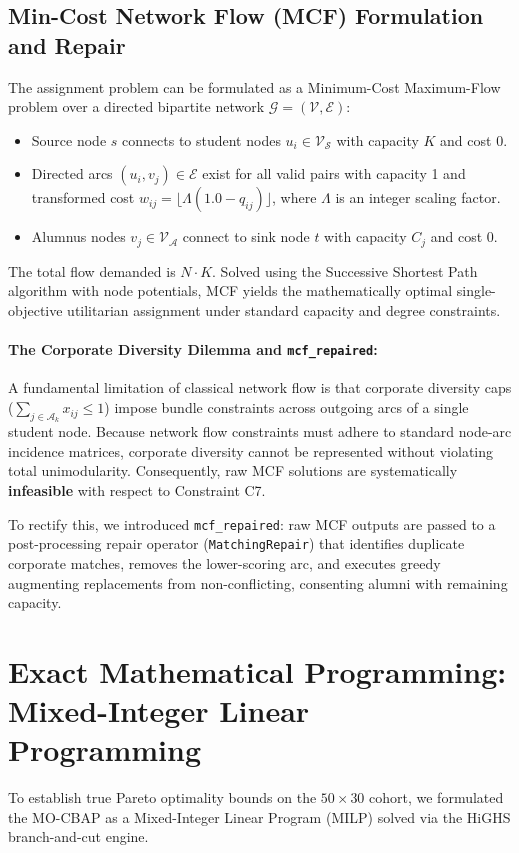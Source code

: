 \subsection{Min-Cost Network Flow (MCF) Formulation and Repair}
The assignment problem can be formulated as a Minimum-Cost Maximum-Flow problem over a directed bipartite network $\mathcal{G} = (\mathcal{V}, \mathcal{E})$:
\begin{itemize}
    \item Source node $s$ connects to student nodes $u_i \in \mathcal{V}_{\mathcal{S}}$ with capacity $K$ and cost 0.
    \item Directed arcs $(u_i, v_j) \in \mathcal{E}$ exist for all valid pairs with capacity 1 and transformed cost $w_{ij} = \lfloor \Lambda (1.0 - q_{ij}) \rfloor$, where $\Lambda$ is an integer scaling factor.
    \item Alumnus nodes $v_j \in \mathcal{V}_{\mathcal{A}}$ connect to sink node $t$ with capacity $C_j$ and cost 0.
\end{itemize}
The total flow demanded is $N \cdot K$. Solved using the Successive Shortest Path algorithm with node potentials, MCF yields the mathematically optimal single-objective utilitarian assignment under standard capacity and degree constraints.

\paragraph{The Corporate Diversity Dilemma and \texttt{mcf\_repaired}:}
A fundamental limitation of classical network flow is that corporate diversity caps ($\sum_{j \in \mathcal{A}_k} x_{ij} \le 1$) impose bundle constraints across outgoing arcs of a single student node. Because network flow constraints must adhere to standard node-arc incidence matrices, corporate diversity cannot be represented without violating total unimodularity. Consequently, raw MCF solutions are systematically \textbf{infeasible} with respect to Constraint C7. 

To rectify this, we introduced \texttt{mcf\_repaired}: raw MCF outputs are passed to a post-processing repair operator (\texttt{MatchingRepair}) that identifies duplicate corporate matches, removes the lower-scoring arc, and executes greedy augmenting replacements from non-conflicting, consenting alumni with remaining capacity.

\section{Exact Mathematical Programming: Mixed-Integer Linear Programming}
To establish true Pareto optimality bounds on the $50 \times 30$ cohort, we formulated the MO-CBAP as a Mixed-Integer Linear Program (MILP) solved via the HiGHS branch-and-cut engine.


